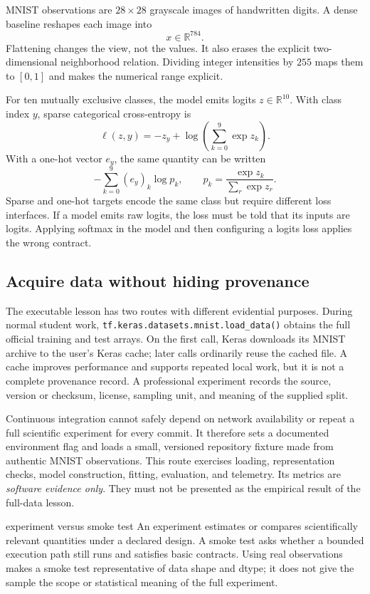 MNIST observations are $28\times28$ grayscale images of handwritten digits.
A dense baseline reshapes each image into
\[
  x\in\mathbb{R}^{784}.
\]
Flattening changes the view, not the values. It also erases the explicit
two-dimensional neighborhood relation. Dividing integer intensities by $255$
maps them to $[0,1]$ and makes the numerical range explicit.

For ten mutually exclusive classes, the model emits logits
$z\in\mathbb{R}^{10}$. With class index $y$, sparse categorical
cross-entropy is
\[
  \ell(z,y)=-z_y+\log\left(\sum_{k=0}^{9}\exp z_k\right).
\]
With a one-hot vector $e_y$, the same quantity can be written
\[
  -\sum_{k=0}^{9}(e_y)_k\log p_k,
  \qquad
  p_k=\frac{\exp z_k}{\sum_r\exp z_r}.
\]
Sparse and one-hot targets encode the same class but require different loss
interfaces. If a model emits raw logits, the loss must be told that its inputs
are logits. Applying softmax in the model and then configuring a logits loss
applies the wrong contract.

\subsection{Acquire data without hiding provenance}

The executable lesson has two routes with different evidential purposes.
During normal student work,
\texttt{tf.keras.datasets.mnist.load\_data()} obtains the full official
training and test arrays. On the first call, Keras downloads its MNIST archive
to the user's Keras cache; later calls ordinarily reuse the cached file. A
cache improves performance and supports repeated local work, but it is not a
complete provenance record. A professional experiment records the source,
version or checksum, license, sampling unit, and meaning of the supplied split.

Continuous integration cannot safely depend on network availability or repeat
a full scientific experiment for every commit. It therefore sets a documented
environment flag and loads a small, versioned repository fixture made from
authentic MNIST observations. This route exercises loading, representation
checks, model construction, fitting, evaluation, and telemetry. Its metrics
are \emph{software evidence only}. They must not be presented as the empirical
result of the full-data lesson.

\begin{definitionbox}{experiment versus smoke test}
An experiment estimates or compares scientifically relevant quantities under
a declared design. A smoke test asks whether a bounded execution path still
runs and satisfies basic contracts. Using real observations makes a smoke test
representative of data shape and dtype; it does not give the sample the scope
or statistical meaning of the full experiment.
\end{definitionbox}

